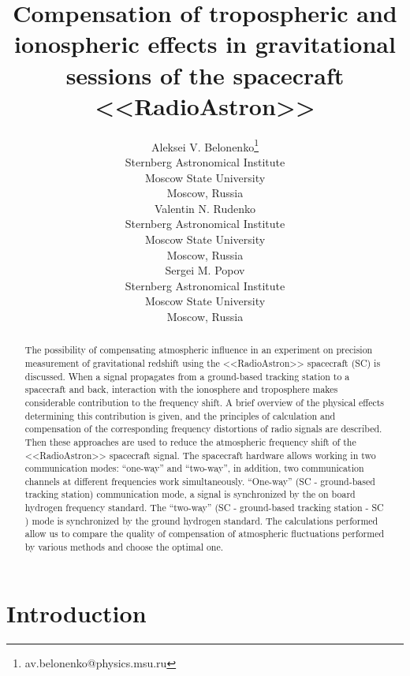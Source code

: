 \documentclass[a4paper,english,bopenany]{article}
\title{Compensation of tropospheric and ionospheric effects in gravitational sessions of the spacecraft <<RadioAstron>>}
\author{
  Aleksei V. Belonenko\thanks{av.belonenko@physics.msu.ru} \\
Sternberg Astronomical Institute\\
Moscow State University\\
 Moscow, Russia \\
\And
Valentin N. Rudenko \\
Sternberg Astronomical Institute\\
Moscow State University\\
 Moscow, Russia \\
\And
Sergei M. Popov \\
Sternberg Astronomical Institute\\
Moscow State University\\
Moscow, Russia \\  
}
\begin{document}
	\maketitle	
	\begin{abstract}

The possibility of compensating atmospheric influence in an experiment on precision measurement of gravitational redshift using the <<RadioAstron>> spacecraft (SC) is discussed. When a signal propagates from a ground-based tracking station to a spacecraft and back, interaction with the ionosphere and troposphere makes considerable contribution to the frequency shift. A brief overview of the physical effects determining this contribution is given, and the principles of calculation and compensation of the corresponding frequency distortions of radio signals are described. Then these approaches are used to reduce the atmospheric frequency shift of the <<RadioAstron>> spacecraft signal. The spacecraft hardware allows working in two communication modes: “one-way” and “two-way”, in addition, two communication channels at different frequencies work simultaneously. “One-way” (SC - ground-based tracking station) communication mode, a signal is synchronized by the on board hydrogen frequency standard. The “two-way” (SC - ground-based tracking station - SC ) mode is synchronized by the ground hydrogen standard. The calculations performed allow us to compare the quality of compensation of atmospheric fluctuations performed by various methods and choose the optimal one.


	\end{abstract}



\newpage
\section{Introduction}
\end{document}
